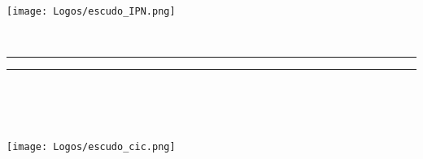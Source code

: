 \begin{titlepage}
        \thispagestyle{empty}
        \begin{minipage}[c][0.17\textheight][c]{0.25\textwidth}
            \begin{center}
                \texttt{[image: Logos/escudo\_IPN.png]}
            \end{center}
        \end{minipage}
        \begin{minipage}[c][0.195\textheight][t]{0.75\textwidth}
            \begin{center}
                \vspace{0.3cm}
                \textsc{\large \univname}\\[0.5cm]
                \vspace{0.3cm}
                \hrule height2.5pt
                \vspace{.2cm}
                \hrule height1pt
                \vspace{.8cm}
                \textsc{\deptname\\
                    \groupname }\\[0.5cm] %
            \end{center}
        \end{minipage}
        \begin{minipage}[c][0.81\textheight][t]{0.25\textwidth}
            \vspace*{5mm}
            \begin{center}
                \hskip2.0mm
                \vrule width1pt height13cm 
                \vspace{5mm}
                \hskip2pt
                \vrule width2.5pt height13cm
                \hskip2mm
                \vrule width1pt height13cm \\
                \vspace{5mm}
                \texttt{[image: Logos/escudo\_cic.png]}
            \end{center}
        \end{minipage}
        \begin{minipage}[c][0.81\textheight][t]{0.75\textwidth}
            \begin{center}
                \vspace{1cm}

                {\large\scshape \ttitle}\\[.2in]


\end{center}
\end{minipage}
\end{titlepage}
